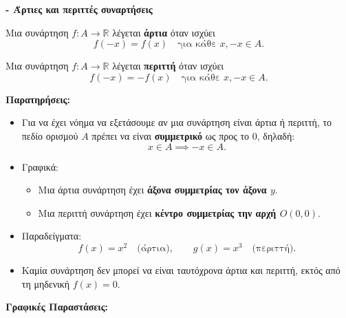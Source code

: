 {\large \textbf{- Άρτιες και περιττές συναρτήσεις}}
\vspace{1em}

Μια συνάρτηση $f: A \to \mathbb{R}$ λέγεται \textbf{άρτια} όταν ισχύει
\[
f(-x) = f(x) \quad \text{για κάθε } x, -x \in A.
\]

\vspace{1em}

Μια συνάρτηση $f: A \to \mathbb{R}$ λέγεται \textbf{περιττή} όταν ισχύει
\[
f(-x) = -f(x) \quad \text{για κάθε } x, -x \in A.
\]

\vspace{1em}

\textbf{Παρατηρήσεις:}
\begin{itemize}
  \item Για να έχει νόημα να εξετάσουμε αν μια συνάρτηση είναι άρτια ή περιττή, το πεδίο ορισμού $A$ πρέπει να είναι \textbf{συμμετρικό} ως προς το $0$, δηλαδή:
  \[
  x \in A \implies -x \in A.
  \]
  \item Γραφικά:
  \begin{itemize}
    \item Μια άρτια συνάρτηση έχει \textbf{άξονα συμμετρίας τον άξονα $y$}.
    \item Μια περιττή συνάρτηση έχει \textbf{κέντρο συμμετρίας την αρχή $O(0,0)$}.
  \end{itemize}
  \item Παραδείγματα:
  \[
  f(x) = x^2 \quad \text{(άρτια)}, \qquad g(x) = x^3 \quad \text{(περιττή)}.
  \]
  \item Καμία συνάρτηση δεν μπορεί να είναι ταυτόχρονα άρτια και περιττή, εκτός από τη μηδενι\-κή $f(x)=0$.
\end{itemize}

\textbf{Γραφικές Παραστάσεις:}

